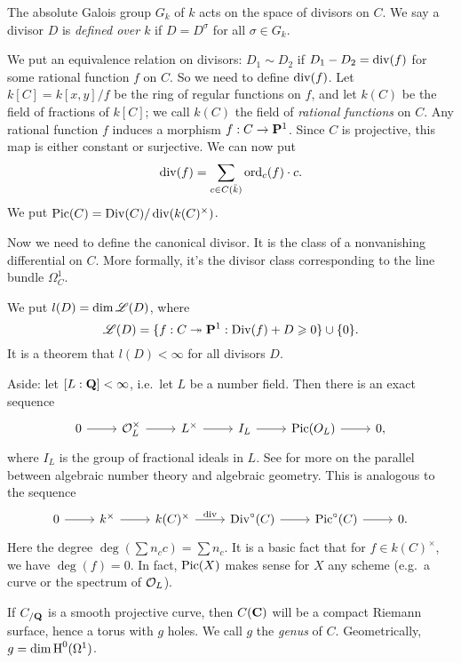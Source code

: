 The absolute Galois group $G_k$ of $k$ acts on the space of divisors on $C$. We 
say a divisor $D$ is \emph{defined over $k$} if $D=D^\sigma$ for all 
$\sigma\in G_k$. 

We put an equivalence relation on divisors: $D_1\sim D_2$ if 
$D_1-D_2=\operatorname{div}(f)$ for some rational function $f$ on $C$. 
So we need to define $\operatorname{div}(f)$. Let $k[C]=k[x,y]/f$ be the ring of regular 
functions on $f$, and let $k(C)$ be the field of fractions of $k[C]$; we call 
$k(C)$ the field of \emph{rational functions} on $C$. Any rational function 
$f$ induces a morphism $f:C\to \mathbf{P}^1$. Since $C$ is projective, this map is 
either constant or surjective. We can now put 
\[
  \operatorname{div}(f) = \sum_{c\in C(\bar k)} \operatorname{ord}_c(f) \cdot c.
\]
We put $\operatorname{Pic}(C)=\operatorname{Div}(C)/\operatorname{div}(k(C)^\times)$. 

Now we need to define the canonical divisor. It is the class of a nonvanishing 
differential on $C$. More formally, it's the divisor class corresponding to the 
line bundle $\Omega_C^1$. 

We put $l(D)=\dim \mathscr{L}(D)$, where 
\[
  \mathscr{L}(D) = \{f:C\twoheadrightarrow \mathbf{P}^1:\operatorname{Div}(f)+D\geqslant 0\} \cup \{0\}.
\]
It is a theorem that $l(D) < \infty$ for all divisors $D$. 

Aside: let $[L:\mathbf{Q}]<\infty$, i.e.~let $L$ be a number field. Then there is an 
exact sequence 
\[\begin{tikzcd}
  0 \ar[r] 
    & \cO_L^\times \ar[r] 
    & L^\times \ar[r] 
    & I_L \ar[r] 
    & \picard(O_L) \ar[r] 
    & 0 ,
\end{tikzcd}\]
where $I_L$ is the group of fractional ideals in $L$. See 
\cite{lorenzini-1996} for more on the parallel between 
algebraic number theory and algebraic geometry. This is analogous to the 
sequence 
\[\begin{tikzcd}
  0 \ar[r] 
    & k^\times \ar[r] 
    & k(C)^\times \ar[r, "\divisor"] 
    & \divisors^\circ(C) \ar[r] 
    & \picard^\circ(C) \ar[r] 
    & 0 .
\end{tikzcd}\]
Here the degree $\deg(\sum n_c c) = \sum n_c$. It is a basic fact that for 
$f\in k(C)^\times$, we have $\deg(f)=0$. In fact, $\operatorname{Pic}(X)$ makes sense 
for $X$ any scheme (e.g.~a curve or the spectrum of $\mathcal{O}_L$). 

If $C_{/\mathbf{Q}}$ is a smooth projective curve, then $C(\mathbf{C})$ will be a compact 
Riemann surface, hence a torus with $g$ holes. We call $g$ the \emph{genus} of 
$C$. Geometrically, $g=\dim \operatorname{H}^0(\Omega^1)$. 

